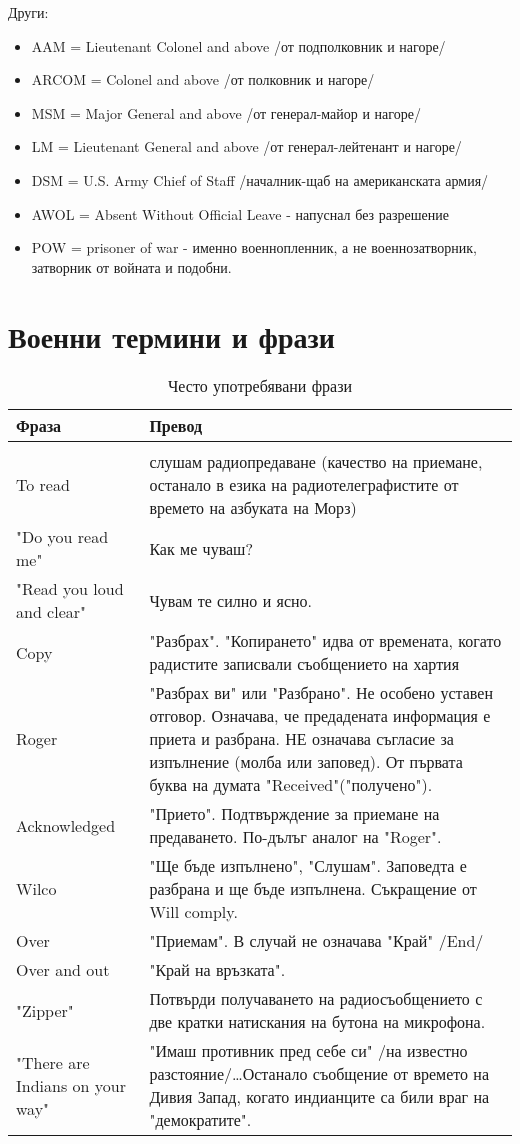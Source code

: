 Други:
\begin{itemize}
    \item AAM = Lieutenant Colonel and above /от подполковник и нагоре/
    \item ARCOM = Colonel and above /от полковник и нагоре/
    \item MSM = Major General and above /от генерал-майор и нагоре/
    \item LM = Lieutenant General and above /от генерал-лейтенант и нагоре/
    \item DSM = U.S. Army Chief of Staff /началник-щаб на американската армия/
    \item AWOL = Absent Without Official Leave - напуснал без разрешение
    \item POW = prisoner of war - именно военнопленник, а не военнозатворник, затворник от войната и подобни.
\end{itemize}

\section{Военни термини и фрази}

\begin{longtable}{|p{}|p{}|}
\hline
\textbf{Фраза} & \textbf{Превод} \\
\hline
\endhead
\hline
\endfoot
\hline
\caption{Често употребявани фрази} \label{tab:frazi} \\
\endlastfoot
To read & слушам радиопредаване (качество на приемане, останало в езика на радиотелеграфистите от времето на азбуката на Морз)\\ 
"Do you read me" & Как ме чуваш?\\ 
"Read you loud and clear" & Чувам те силно и ясно.\\ 
Copy & "Разбрах". "Копирането" идва от времената, когато радистите записвали съобщението на хартия\\ 

Roger & "Разбрах ви" или "Разбрано". Не особено уставен отговор. Означава, че предадената информация е приета и разбрана. НЕ означава съгласие за изпълнение (молба или заповед). От първата буква на думата "Received"("получено").\\ 

Acknowledged & "Прието". Подтвърждение за приемане на предаването. По-дълъг аналог на "Roger".\\ 

Wilco & "Ще бъде изпълнено", "Слушам". Заповедта е разбрана и ще бъде изпълнена. Съкращение от Will comply.\\ 

Over & "Приемам". В случай не означава "Край" /End/\\ 
Over and out & "Край на връзката".\\ 
"Zipper" & Потвърди получаването на радиосъобщението с две кратки натискания на бутона на микрофона.\\ 
"There are Indians on your way" & "Имаш противник пред себе си" /на известно разстояние/\dots Останало съобщение от времето на Дивия Запад, когато индианците са били враг на "демократите".\\ 
\end{longtable}

